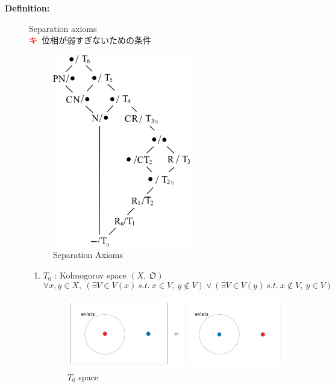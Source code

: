 \documentclass[english,dvipdfmx]{jsarticle}
\newcommand*{\point}{\textcircled{\textcolor{red}{\scriptsize キ}}}
\begin{document}
\begin{description}
    \item[\bf{Definition:}] Separation axioms \\
        \point \ 位相が弱すぎないための条件
        \begin{figure}[H]
            \begin{center}
                \includegraphics[clip,width=6cm]{./separate_axiom.png}
                \caption{Separation Axioms}
            \end{center}
        \end{figure}
        \begin{enumerate}
            \item $T_0$ : Kolmogorov space $(X,\ \mathfrak{O})$ \\
            $$\forall x,y \in X,\ (\exists V \in V(x) \ s.t. \  x \in V,\ y \notin V ) \lor (\exists V \in V(y) \ s.t. \  x \notin V,\ y \in V )$$
                \begin{figure}[H]
                    \begin{center}
                        \includegraphics[clip,width=10cm]{./T0.png}
                        \caption{$T_0$ space}
                    \end{center}
                \end{figure}
            

\end{enumerate}
\end{description}
\end{document}
